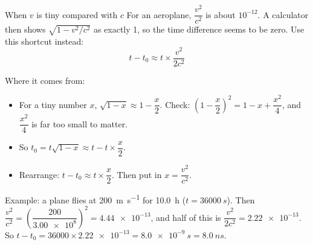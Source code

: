\begin{toolkit}{When $v$ is tiny compared with $c$}
For an aeroplane, $\dfrac{v^2}{c^2}$ is about $10^{-12}$. A calculator then shows
$\sqrt{1 - v^2/c^2}$ as exactly 1, so the time difference seems to be zero. Use this shortcut
instead:
\[ t - t_0 \approx t \times \frac{v^2}{2c^2} \]
{\centering\hscbadgenotonsheet\par}
Where it comes from:
\begin{itemize}
  \item For a tiny number $x$, $\sqrt{1 - x} \approx 1 - \dfrac{x}{2}$. Check:
        $\left(1 - \dfrac{x}{2}\right)^2 = 1 - x + \dfrac{x^2}{4}$, and $\dfrac{x^2}{4}$ is far
        too small to matter.
  \item So $t_0 = t\sqrt{1 - x} \approx t - t \times \dfrac{x}{2}$.
  \item Rearrange: $t - t_0 \approx t \times \dfrac{x}{2}$. Then put in $x = \dfrac{v^2}{c^2}$.
\end{itemize}
Example: a plane flies at \qty{200}{m.s^{-1}} for \qty{10.0}{h} ($t = \qty{36000}{s}$).
Then $\dfrac{v^2}{c^2} = \left(\dfrac{200}{\num{3.00e8}}\right)^2 = \num{4.44e-13}$, and half
of this is $\dfrac{v^2}{2c^2} = \num{2.22e-13}$. So
$t - t_0 = \num{36000} \times \num{2.22e-13} = \qty{8.0e-9}{s} = \qty{8.0}{ns}$.
\end{toolkit}

